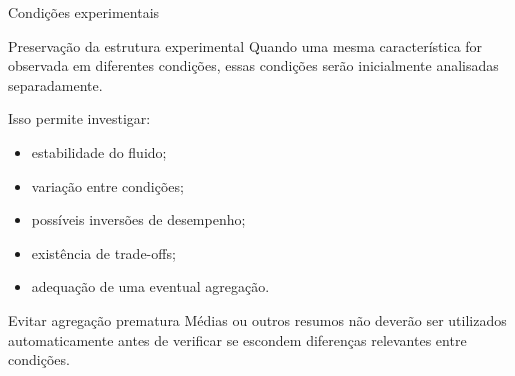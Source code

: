 \begin{frame}{Condições experimentais}

    \begin{block}{Preservação da estrutura experimental}
        Quando uma mesma característica for observada em diferentes
        condições, essas condições serão inicialmente analisadas
        separadamente.
    \end{block}

    \vspace{0.3cm}

    Isso permite investigar:

    \begin{itemize}
        \item estabilidade do fluido;
        \item variação entre condições;
        \item possíveis inversões de desempenho;
        \item existência de trade-offs;
        \item adequação de uma eventual agregação.
    \end{itemize}

    \vspace{0.3cm}

    \begin{alertblock}{Evitar agregação prematura}
        Médias ou outros resumos não deverão ser utilizados
        automaticamente antes de verificar se escondem diferenças
        relevantes entre condições.
    \end{alertblock}

\end{frame}



